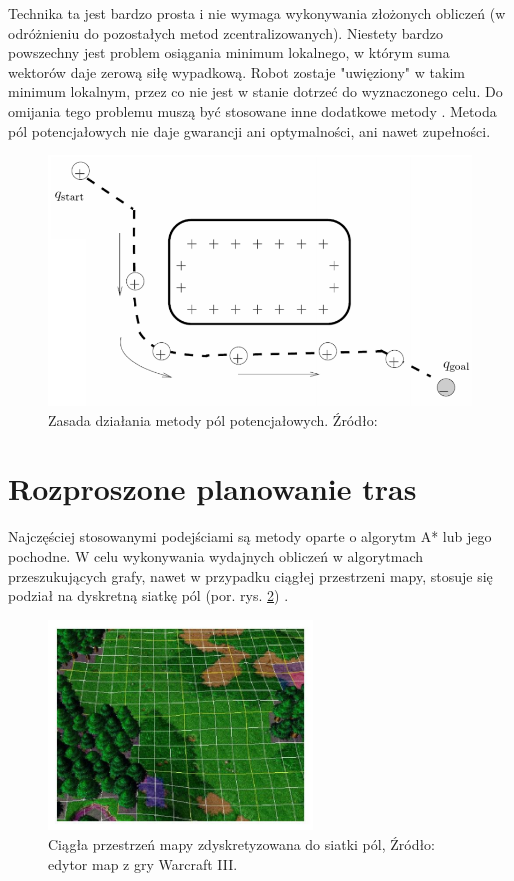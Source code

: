 Technika ta jest bardzo prosta i nie wymaga wykonywania złożonych obliczeń (w odróżnieniu do pozostałych metod zcentralizowanych).
Niestety bardzo powszechny jest problem osiągania minimum lokalnego, w którym suma wektorów daje zerową siłę wypadkową. Robot zostaje "uwięziony" w takim minimum lokalnym, przez co nie jest w stanie dotrzeć do wyznaczonego celu. Do omijania tego problemu muszą być stosowane inne dodatkowe metody \cite{potentialfield}.
Metoda pól potencjałowych nie daje gwarancji ani optymalności, ani nawet zupełności.
\begin{figure}
	\centering
	\includegraphics[width=12cm]{img/potential-field}
	\caption{Zasada działania metody pól potencjałowych. Źródło: \cite{howie_potentialfield}}
	\label{fig:image_potentialfield}
\end{figure}

\section{Rozproszone planowanie tras}
Najczęściej stosowanymi podejściami są metody oparte o algorytm A* lub jego pochodne.
W celu wykonywania wydajnych obliczeń w algorytmach przeszukujących grafy, nawet w przypadku ciągłej przestrzeni mapy, stosuje się podział na dyskretną siatkę pól (por. rys. \ref{fig:img_games_warcraft-map-editor}) \cite{hierpathfindinginrts}.

\begin{figure}[H]
	\centering
	\includegraphics[width=7cm]{img/games/warcraft-map-editor}
	\caption{Ciągła przestrzeń mapy zdyskretyzowana do siatki pól, Źródło: edytor map z gry Warcraft III.}
	\label{fig:img_games_warcraft-map-editor}
\end{figure}

